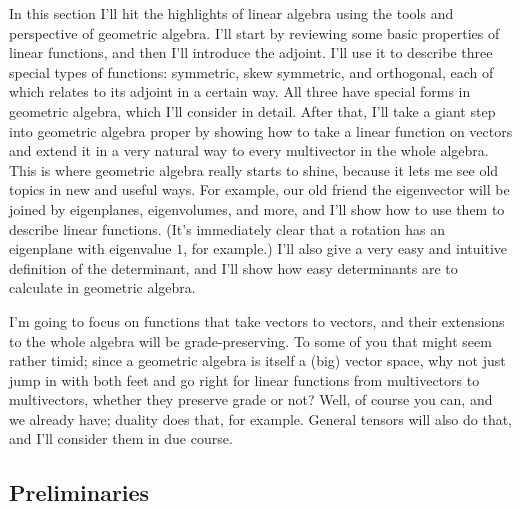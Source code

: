 \documentclass{utarticle}
\begin{document}
In this section I'll hit the highlights of linear algebra using the tools and perspective 
of geometric algebra.  I'll start by reviewing some basic properties of linear functions, 
and then I'll introduce the adjoint.  I'll use it to describe three special types of functions: 
symmetric, skew symmetric, and orthogonal, each of which relates to its adjoint in 
a certain way.  All three have special forms in geometric algebra, which I'll consider 
in detail.  After that, I'll take a giant step into geometric algebra proper by showing 
how to take a linear function on vectors and extend it in a very natural way to every 
multivector in the whole algebra.  This is where geometric algebra really starts to shine, 
because it lets me see old topics in new and useful ways.  For example, our old friend the
eigenvector will be joined by eigenplanes, eigenvolumes, and more, and I'll show how
to use them to describe linear functions.  (It's immediately clear that a rotation has an 
eigenplane with eigenvalue $1$, for example.)  I'll also give a very easy and intuitive 
definition of the determinant, and I'll show how easy determinants are to calculate in 
geometric algebra.

I'm going to focus on functions that take vectors to vectors, and their
extensions to the whole algebra will be grade-preserving.  To some of you that might 
seem rather timid; since a geometric algebra is itself a (big) vector space, why not just jump in
with both feet and go right for linear functions from multivectors to multivectors, whether 
they preserve grade or not?  Well, of course you can, and we already have; duality does that, for 
example.  General tensors will also do that, and I'll consider them in due course.


\subsection{Preliminaries}
\label{prelims}
\end{document}
